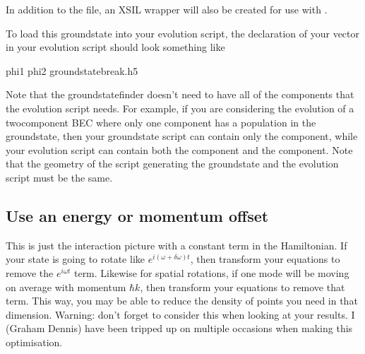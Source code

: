 \documentclass[letterpaper,10pt,english]{sphinxmanual}
\begin{document}
\sphinxAtStartPar
In addition to the  file, an XSIL wrapper  will also be created for use with {\hyperref[\detokenize{xsil2graphics2:xsil2graphics2}]{}}.

\sphinxAtStartPar
To load this groundstate into your evolution script, the declaration of your  vector in your evolution script should look something like

\begin{sphinxVerbatim}[commandchars=\\\{\}]
 
  phi1 phi2
   
    groundstate\PYGZus{}break.h5
\end{sphinxVerbatim}

\sphinxAtStartPar
Note that the groundstate\sphinxhyphen{}finder doesn’t need to have all of the components that the evolution script needs. For example, if you are considering the evolution of a two\sphinxhyphen{}component BEC where only one component has a population in the groundstate, then your groundstate script can contain only the  component, while your evolution script can contain both the  component and the  component. Note that the geometry of the script generating the groundstate and the evolution script must be the same.


\subsection{Use an energy or momentum offset}
\label{\detokenize{optimisation_hints:use-an-energy-or-momentum-offset}}
\sphinxAtStartPar
This is just the interaction picture with a constant term in the Hamiltonian. If your state is going to rotate like \(e^{i(\omega + \delta\omega)t}\), then transform your equations to remove the \(e^{i \omega t}\) term. Likewise for spatial rotations, if one mode will be moving on average with momentum \(\hbar k\), then transform your equations to remove that term. This way, you may be able to reduce the density of points you need in that dimension. Warning: don’t forget to consider this when looking at your results. I (Graham Dennis) have been tripped up on multiple occasions when making this optimisation.
\end{document}
